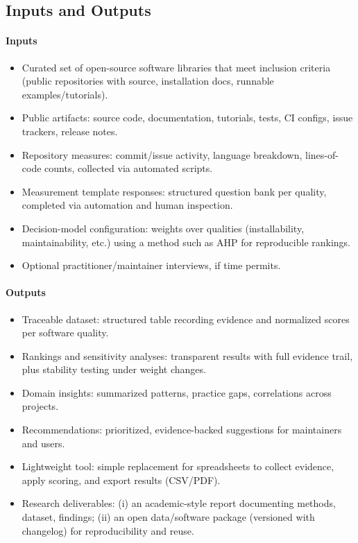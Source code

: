 \documentclass{article}
\begin{document}
\subsection{Inputs and Outputs}
\paragraph{Inputs}
\begin{itemize}
  \item Curated set of open-source software libraries that meet inclusion criteria
  (public repositories with source, installation docs, runnable examples/tutorials).
  \item Public artifacts: source code, documentation, tutorials, tests, CI configs,
  issue trackers, release notes.
  \item Repository measures: commit/issue activity, language breakdown,
  lines-of-code counts, collected via automated scripts.
  \item Measurement template responses: structured question bank per quality,
  completed via automation and human inspection.
  \item Decision-model configuration: weights over qualities (installability,
  maintainability, etc.) using a method such as AHP for reproducible rankings.
  \item Optional practitioner/maintainer interviews, if time permits.
\end{itemize}

\paragraph{Outputs}
\begin{itemize}
  \item Traceable dataset: structured table recording evidence and normalized
  scores per software quality.
  \item Rankings and sensitivity analyses: transparent results with full evidence trail,
  plus stability testing under weight changes.
  \item Domain insights: summarized patterns, practice gaps, correlations across projects.
  \item Recommendations: prioritized, evidence-backed suggestions for maintainers and users.
  \item Lightweight tool: simple replacement for spreadsheets to collect evidence,
  apply scoring, and export results (CSV/PDF).
  \item Research deliverables: (i) an academic-style report documenting methods,
  dataset, findings; (ii) an open data/software package (versioned with changelog)
  for reproducibility and reuse.
\end{itemize}
\end{document}
